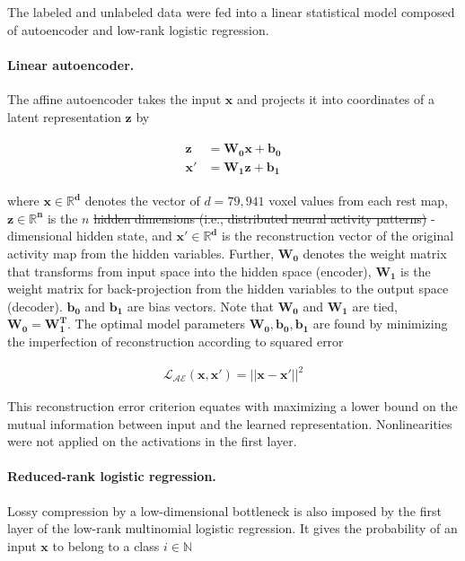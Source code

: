 \documentclass{article} %
\newcommand{\suggestadd}[1]{{\color{blue} #1}}
\newcommand{\suggestremove}[1]{{\color{red} \sout{#1}}}
\begin{document}
The labeled and unlabeled data were fed into a linear statistical model
composed of autoencoder and low-rank logistic regression.

\paragraph{Linear autoencoder.}
The affine autoencoder takes the input 
$\mathbf{x}$ and projects it into coordinates of a
latent representation $\mathbf{z}$
by

\begin{eqnarray}
  \begin{split}
    \mathbf{z} &= \mathbf{W_0} \mathbf{x} + \mathbf{b_0} \\
    \mathbf{x'} &= \mathbf{W_1} \mathbf{z} + \mathbf{b_1}
  \end{split}
  \label{eq:autoenc}
\end{eqnarray}

where $\mathbf{x \in \mathbb{R}^{d}}$ denotes the vector of $d=79{,}941$
voxel values from each
rest map,
$\mathbf{z \in \mathbb{R}^{n}}$ is the $n$\suggestremove{ hidden dimensions 
(i.e.,
distributed neural activity patterns)}
\suggestadd{-dimensional hidden state}, and 
$\mathbf{x' \in \mathbb{R}^{d}}$
is the reconstruction vector of the original activity map
from the hidden variables. 
Further, $\mathbf{W_0}$ denotes the weight matrix that
transforms
from input space into the hidden space (encoder),
$\mathbf{W_1}$ is the weight matrix for back-projection
from the hidden variables to the
output space (decoder).
$\mathbf{b_0}$ and $\mathbf{b_1}$ are bias vectors.
Note that $\mathbf{W_0}$ and $\mathbf{W_1}$ are tied,
$\mathbf{W_0} = \mathbf{W_1^T}$.
The optimal model parameters $\mathbf{W_0, b_0, b_1}$ are found by
minimizing the imperfection of reconstruction according to squared error

\begin{eqnarray}
  {\mathcal{L_{AE}}}(\mathbf{x}, \mathbf{x'}) = || \mathbf{x} - \mathbf{x'} ||^2
\end{eqnarray}

This reconstruction error criterion equates with
maximizing a lower bound on the mutual information between
input and the learned representation.
Nonlinearities were not applied on the
activations in the first layer.

\paragraph{Reduced-rank logistic regression.}
Lossy compression by a low-dimensional bottleneck
is also imposed by the first layer of the low-rank
multinomial logistic regression.
It gives the probability of an input $\mathbf{x}$ to belong
to a class $i \in \mathbb{N}$
\end{document}
